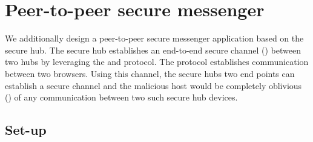 \section{Peer-to-peer secure messenger}
\label{sec:p2p}

We additionally design a peer-to-peer secure messenger application based on the
secure hub. The secure hub establishes an end-to-end secure channel (\tls)
between two hubs by leveraging the \webusb and \webrtc protocol. The \webrtc
protocol establishes communication between two browsers. Using this channel, the
secure hubs two end points can establish a secure channel and the malicious host
would be completely oblivious () of
any communication between two such secure hub devices.


\subsection{Set-up}